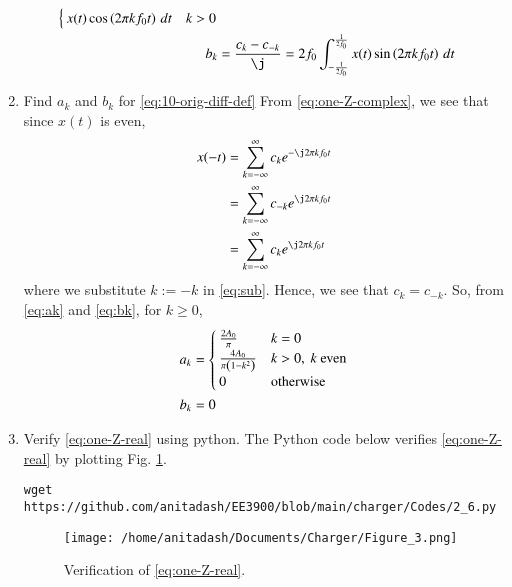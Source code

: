 \documentclass[journal,12pt,twocolumn]{IEEEtran}
\renewcommand\thesection{\arabic{section}}
\begin{document}
\begin{enumerate}[label=\thesection.\arabic*,ref=\thesection.\theenumi]
\begin{align}
\begin{cases}
        x(t)\cos\brak{2\pi kf_0t}\, dt & k > 0
    \end{cases} \\
    b_k &= \frac{c_k - c_{-k}}{\j} = 2f_0\int_{-\frac{1}{2f_0}}^{\frac{1}{2f_0}}
    x(t)\sin\brak{2\pi kf_0t}\, dt
    \label{eq:bk}
\end{align}
\item Find $a_k$ and $b_k$ for 
	\eqref{eq:10-orig-diff-def}
\solution From \eqref{eq:one-Z-complex}, we see that since $x(t)$ is even,
\begin{align}
    x(-t) &= \sum_{k = -\infty}^{\infty}c_ke^{-\j2\pi kf_0 t} \\
          &= \sum_{k = -\infty}^{\infty}c_{-k}e^{\j2\pi kf_0t} \label{eq:sub} \\
          &= \sum_{k = -\infty}^{\infty}c_ke^{\j2\pi kf_0 t}
\end{align}
where we substitute $k := -k$ in \eqref{eq:sub}. Hence, we see that 
$c_k = c_{-k}$. So, from \eqref{eq:ak} and \eqref{eq:bk}, for $k \ge 0$,
\begin{align}
    a_k &= 
    \begin{cases}
        \frac{2A_0}{\pi} & k = 0 \\
        \frac{4A_0}{\pi\left(1 - k^2\right)} & k > 0,\ k\ \text{even} \\
        0 & \text{otherwise}
    \end{cases} \label{eq:ak-xt}\\
    b_k &= 0
    \label{eq:bk-xt}
\end{align}
\item Verify 
\eqref{eq:one-Z-real}
using python.
\solution The Python code below verifies \eqref{eq:one-Z-real}
by plotting Fig. \ref{fig:ver-real}.
\begin{lstlisting}
wget https://github.com/anitadash/EE3900/blob/main/charger/Codes/2_6.py
\end{lstlisting}
\begin{figure}[!ht]
    \texttt{[image: /home/anitadash/Documents/Charger/Figure\_3.png]}
    \caption{Verification of \eqref{eq:one-Z-real}.}
    \label{fig:ver-real}
\end{figure}
\end{enumerate}
\end{document}
